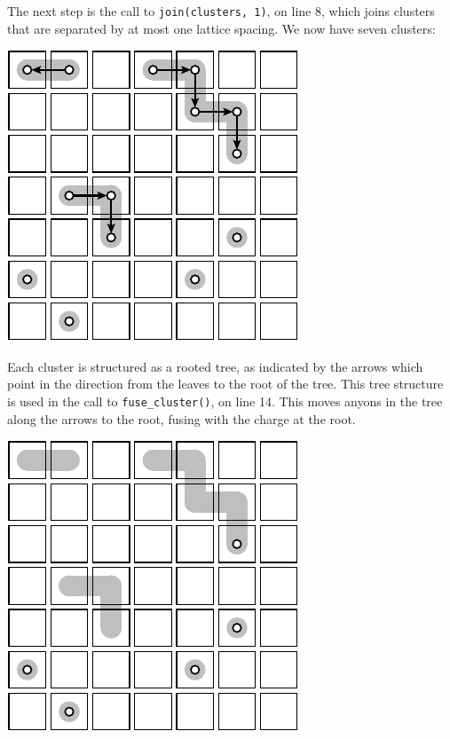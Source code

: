\begin{samepage}
The next step is the call to {\tt join(clusters, 1)}, on line 8,
which joins clusters that are separated by at most one lattice
spacing. We now have seven clusters:
\begin{center}
\includegraphics[]{pic-decode-1.pdf}
\end{center}
\end{samepage}

Each cluster is structured as a rooted tree, as indicated by
the arrows which point in the direction from the leaves to
the root of the tree. 
This tree structure is used in the call to {\tt fuse\_cluster()},
on line 14.
This moves anyons in the tree along the arrows to the root, 
fusing with the charge at the root.
\begin{center}
\includegraphics[]{pic-decode-2.pdf}
\end{center}

